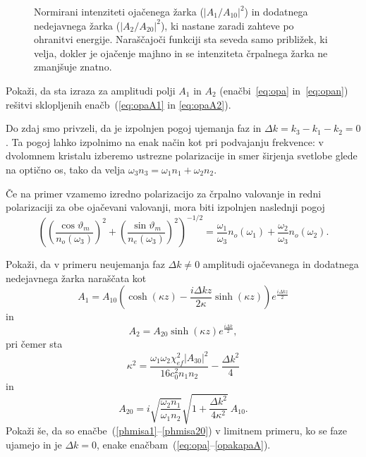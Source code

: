 \begin{figure}[ht]
\centering
\def\svgwidth{90truemm} 

\caption{Normirani intenziteti ojačenega žarka ($|A_1/A_{10}|^2$) in dodatnega 
nedejavnega žarka ($|A_2/A_{20}|^2$), ki nastane zaradi zahteve po ohranitvi energije. 
Naraščajoči funkciji sta seveda samo približek, ki velja, dokler je ojačenje majhno in 
se intenziteta črpalnega žarka ne zmanjšuje znatno.}
\label{fig:opagraf}
\end{figure}

\begin{definition}
Pokaži, da sta izraza za amplitudi polji $A_1$ in $A_2$ (enačbi~\ref{eq:opa} in~\ref{eq:opan})
rešitvi sklopljenih enačb~(\ref{eq:opaA1} in \ref{eq:opaA2}).
\end{definition}

Do zdaj smo privzeli, da je izpolnjen pogoj ujemanja faz 
in $\Delta k=k_{3}-k_{1}-k_{2}=0$. 
Ta pogoj lahko izpolnimo na enak način kot pri podvajanju frekvence: v dvolomnem kristalu 
izberemo ustrezne polarizacije in smer širjenja svetlobe glede na optično os, 
tako da velja $\omega_{3}n_{3}=\omega_{1}n_{1}+\omega_{2}n_{2}$.

Če na primer vzamemo izredno polarizacijo za črpalno valovanje
in redni polarizaciji za obe ojačevani valovanji, mora biti izpolnjen naslednji pogoj 
\begin{equation}
\left(\left(\frac{\cos\vartheta_{m}}{n_{o}(\omega_3)}\right)^{2}
+\left(\frac{\sin\vartheta_{m}}{n_{e}(\omega_3)}\right)^{2}\right)^{-1/2}=
\frac{\omega_{1}}{\omega_{3}}n_{o}(\omega_1)+\frac{\omega_{2}}{\omega_{3}}n_{o}(\omega_2).
\label{8.34}
\end{equation}

\begin{definition}
Pokaži, da v primeru neujemanja faz $\Delta k \neq 0$ amplitudi ojačevanega in dodatnega 
nedejavnega žarka naraščata kot 
\begin{equation}
A_1 = A_{10} \left( \cosh(\kappa z) - \frac{i \Delta kz}{2 \kappa} \sinh (\kappa z) 
\right) e^{\frac{i \Delta kz}{2}}
\label{phmisa1}
\end{equation}
in
\begin{equation}
A_2 = A_{20} \sinh(\kappa z) e^{\frac{i \Delta k}{2}},
\end{equation}
pri čemer sta
\begin{equation}
\kappa^2 = \frac{\omega_1 \omega_2 \chi_{ef}^2|A_{30}|^2}
{16 c_0^2 n_1 n_2} - \frac{\Delta k^2}{4}
\end{equation}
in
\begin{equation}
A_{20} = i \sqrt{\frac{\omega_2 n_1}{\omega_1 n_2}} \sqrt{1 + \frac{\Delta k^2}{4 \kappa^2}}
~A_{10}.
\label{phmisa20}
\end{equation}
Pokaži še, da so enačbe~(\ref{phmisa1}--\ref{phmisa20}) v limitnem primeru, 
ko se faze ujamejo in je $\Delta k = 0$,
enake enačbam~(\ref{eq:opa}--\ref{opakapaA}).
\end{definition}

